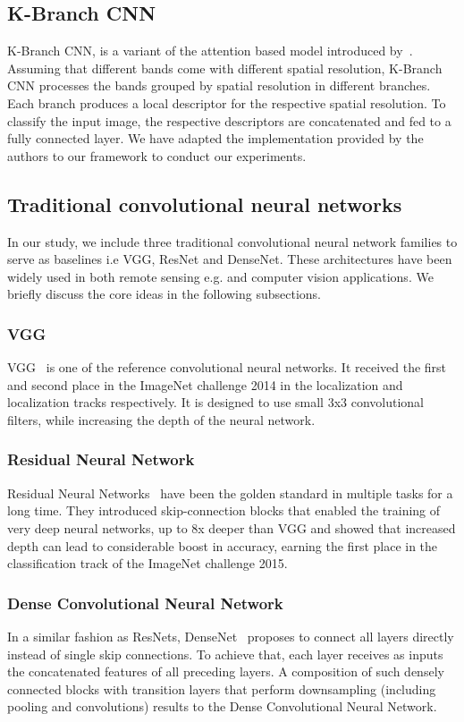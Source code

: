 \documentclass[journal]{IEEEtran}
\begin{document}
\subsection{K-Branch CNN}
K-Branch CNN, is a variant of the attention based model introduced by~\cite{sumbul2019novel}. Assuming that different bands come with different spatial resolution, K-Branch CNN processes the bands grouped by spatial resolution in different branches. Each branch produces a local descriptor for the respective spatial resolution. To classify the input image, the respective descriptors are concatenated and fed to a fully connected layer. We have adapted the implementation provided by the authors to our framework to conduct our experiments.

\subsection{Traditional convolutional neural networks}
In our study, we include three traditional convolutional neural network families to serve as baselines i.e VGG, ResNet and DenseNet. These architectures have been widely used in both remote sensing e.g. \citep{sumbul2021bigearthnetmm,helber2019eurosat,kakogeorgiou2021evaluating} and computer vision applications. We briefly discuss the core ideas in the following subsections.
\subsubsection{VGG}
VGG~\citep{simonyan2015deep} is one of the reference convolutional neural networks. It received the first and second place in the ImageNet challenge 2014 in the localization and localization tracks respectively. It is designed to use small 3x3 convolutional filters, while increasing the depth of the neural network.

\subsubsection{Residual Neural Network}
Residual Neural Networks~\citep{He_2016_CVPR} have been the golden standard in multiple tasks for a long time. They introduced skip-connection blocks that enabled the training of very deep neural networks, up to 8x deeper than VGG and showed that increased depth can lead to considerable boost in accuracy, earning the first place in the classification track of the ImageNet challenge 2015.
\subsubsection{Dense Convolutional Neural Network}
In a similar fashion as ResNets, DenseNet~\citep{Huang_2017_CVPR} proposes to connect all layers directly instead of single skip connections. To achieve that, each layer receives as inputs the concatenated features of all preceding layers. A composition of such densely connected blocks with transition layers that perform downsampling (including pooling and convolutions) results to the Dense Convolutional Neural Network.
\end{document}
